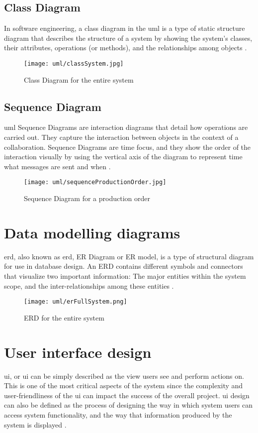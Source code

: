 \documentclass[12pt]{report}
\begin{document}
\newpage
\subsection{Class Diagram}
In software engineering, a class diagram in the \acrfull{uml} is a type of static structure diagram that describes the structure of a system by showing the system's classes, their attributes, operations (or methods), and the relationships among objects \cite{vparadigm_2018_uml}.

\begin{figure}[H]
	\centering
	\texttt{[image: uml/classSystem.jpg]}
	\caption{Class Diagram for the entire system}
\end{figure}

\newpage
\subsection{Sequence Diagram}
\acrshort{uml} Sequence Diagrams are interaction diagrams that detail how operations are carried out. They capture the interaction between objects in the context of a collaboration. Sequence Diagrams are time focus, and they show the order of the interaction visually by using the vertical axis of the diagram to represent time what messages are sent and when \cite{vparadigm_2018_uml}.

\begin{figure}[H]
	\centering
	\texttt{[image: uml/sequenceProductionOrder.jpg]}
	\caption{Sequence Diagram for a production order}
\end{figure}

\section{Data modelling diagrams}
\acrlong{erd}, also known as \acrshort{erd}, ER Diagram or ER model, is a type of structural diagram for use in database design. An ERD contains different symbols and connectors that visualize two important information: The major entities within the system scope, and the inter-relationships among these entities \cite{vparadigm_2018_uml}.

\begin{figure}[H]
	\centering
	\texttt{[image: uml/erFullSystem.png]}
	\caption{ERD for the entire system}
\end{figure}

\newpage
\section{User interface design}
\acrlong{ui}, or \acrshort{ui} can be simply described as the view users see and perform actions on. This is one of the most critical aspects of the system since the complexity and user-­friendliness of the \acrshort{ui} can impact the success of the overall project. \acrshort{ui} design can also be defined as the process of designing the way in which system users can access system functionality, and the way that information produced by the system is displayed \cite{sommerville_2008_se}.
\end{document}
